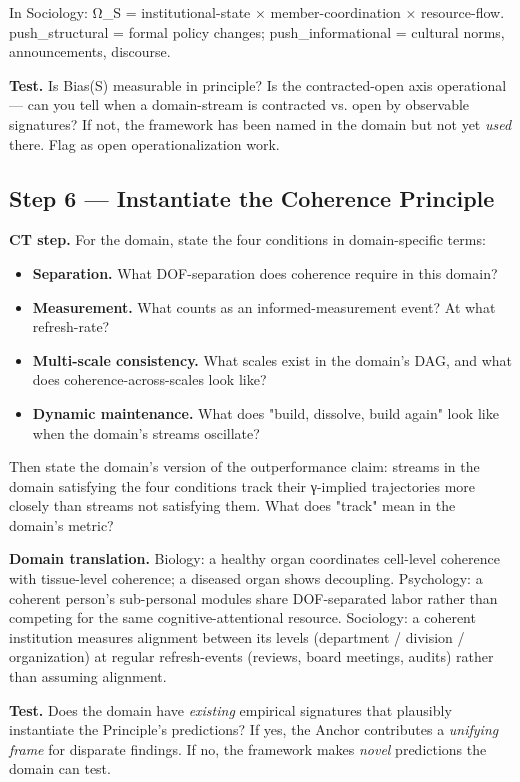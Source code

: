 \documentclass[11pt, openany]{book}
\begin{document}
In Sociology: Ω\_\allowbreak{}S = institutional-state × member-coordination × resource-flow. push\_\allowbreak{}structural = formal policy changes; push\_\allowbreak{}informational = cultural norms, announcements, discourse.

\textbf{Test.} Is Bias(S) measurable in principle? Is the contracted-open axis operational --- can you tell when a domain-stream is contracted vs. open by observable signatures? If not, the framework has been named in the domain but not yet \textit{used} there. Flag as open operationalization work.

\subsection{Step 6 --- Instantiate the Coherence Principle}

\textbf{CT step.} For the domain, state the four conditions in domain-specific terms:

\begin{itemize}
\item \textbf{Separation.} What DOF-separation does coherence require in this domain?
\item \textbf{Measurement.} What counts as an informed-measurement event? At what refresh-rate?
\item \textbf{Multi-scale consistency.} What scales exist in the domain's DAG, and what does coherence-across-scales look like?
\item \textbf{Dynamic maintenance.} What does "build, dissolve, build again" look like when the domain's streams oscillate?
\end{itemize}

Then state the domain's version of the outperformance claim: streams in the domain satisfying the four conditions track their γ-implied trajectories more closely than streams not satisfying them. What does "track" mean in the domain's metric?

\textbf{Domain translation.} Biology: a healthy organ coordinates cell-level coherence with tissue-level coherence; a diseased organ shows decoupling. Psychology: a coherent person's sub-personal modules share DOF-separated labor rather than competing for the same cognitive-attentional resource. Sociology: a coherent institution measures alignment between its levels (department / division / organization) at regular refresh-events (reviews, board meetings, audits) rather than assuming alignment.

\textbf{Test.} Does the domain have \textit{existing} empirical signatures that plausibly instantiate the Principle's predictions? If yes, the Anchor contributes a \textit{unifying frame} for disparate findings. If no, the framework makes \textit{novel} predictions the domain can test.
\end{document}
